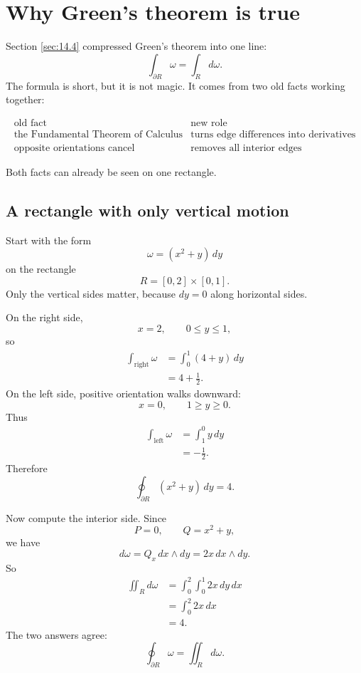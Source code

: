 \section{Why Green's theorem is true}
\label{sec:14.5}

Section \ref{sec:14.4} compressed Green's theorem into one line:
\[
    \int_{\partial R}\omega=\int_R d\omega.
\]
The formula is short, but it is not magic.  It comes from two old facts working
together:

\[
\begin{array}{c|c}
\text{old fact} & \text{new role}\\ \hline
\text{the Fundamental Theorem of Calculus} & \text{turns edge differences into derivatives}\\[1mm]
\text{opposite orientations cancel} & \text{removes all interior edges}
\end{array}
\]

Both facts can already be seen on one rectangle.

\subsection{A rectangle with only vertical motion}

Start with the form
\[
    \omega=(x^2+y)\,dy
\]
on the rectangle
\[
    R=[0,2]\times[0,1].
\]
Only the vertical sides matter, because \(dy=0\) along horizontal sides.

On the right side,
\[
    x=2,
    \qquad
    0\le y\le1,
\]
so
\[
\begin{aligned}
    \int_{\text{right}}\omega
    &=
    \int_0^1(4+y)\,dy\\
    &=
    4+\frac12.
\end{aligned}
\]
On the left side, positive orientation walks downward:
\[
    x=0,
    \qquad
    1\ge y\ge0.
\]
Thus
\[
\begin{aligned}
    \int_{\text{left}}\omega
    &=
    \int_1^0 y\,dy\\
    &=
    -\frac12.
\end{aligned}
\]
Therefore
\[
\boxed{
    \oint_{\partial R}(x^2+y)\,dy=4.
}
\]

Now compute the interior side.  Since
\[
    P=0,
    \qquad
    Q=x^2+y,
\]
we have
\[
    d\omega=Q_x\,dx\wedge dy=2x\,dx\wedge dy.
\]
So
\[
\begin{aligned}
    \iint_R d\omega
    &=
    \int_0^2\int_0^1 2x\,dy\,dx\\
    &=
    \int_0^2 2x\,dx\\
    &=
    4.
\end{aligned}
\]
The two answers agree:
\[
\boxed{
    \oint_{\partial R}\omega=\iint_R d\omega.
}
\]

